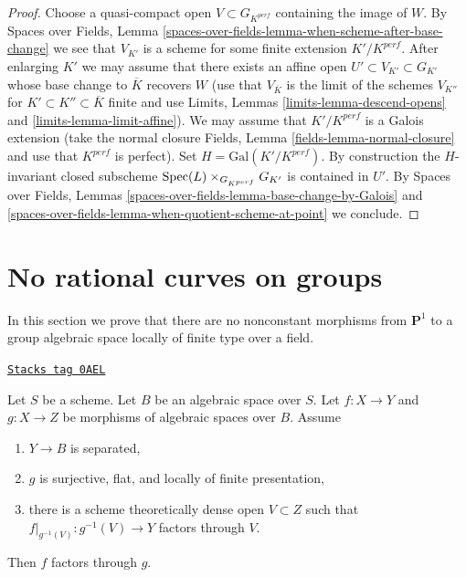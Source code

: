 \begin{proof}
\medskip\noindent
Choose a quasi-compact open $V \subset G_{K^{perf}}$ containing the
image of $W$. By Spaces over Fields,
Lemma \ref{spaces-over-fields-lemma-when-scheme-after-base-change}
we see that $V_{K'}$ is a scheme for some finite extension $K'/K^{perf}$.
After enlarging $K'$ we may assume that there exists an affine open
$U' \subset V_{K'} \subset G_{K'}$ whose base change to $\overline{K}$
recovers $W$ (use that $V_{\overline{K}}$ is the limit of the schemes
$V_{K''}$ for $K' \subset K'' \subset \overline{K}$ finite and use
Limits, Lemmas \ref{limits-lemma-descend-opens} and
\ref{limits-lemma-limit-affine}). We may assume
that $K'/K^{perf}$ is a Galois extension (take the normal closure
Fields, Lemma \ref{fields-lemma-normal-closure} and use
that $K^{perf}$ is perfect). Set $H = \text{Gal}(K'/K^{perf})$.
By construction the $H$-invariant closed subscheme
$\operatorname{Spec}(L) \times_{G_{K^{perf}}} G_{K'}$ is contained in $U'$.
By
Spaces over Fields, Lemmas
\ref{spaces-over-fields-lemma-base-change-by-Galois} and
\ref{spaces-over-fields-lemma-when-quotient-scheme-at-point} we conclude.
\end{proof}

\section{No rational curves on groups}
\label{spaces-more-groupoids-section-no-rational-curves}
In this section we prove that there are no nonconstant morphisms
from $\mathbf{P}^1$ to a group algebraic space locally of finite
type over a field.

\begin{lemma}
\label{spaces-more-groupoids-lemma-factor-through-over-open}
\href{https://stacks.math.columbia.edu/tag/0AEL}{\texttt{Stacks tag 0AEL}}

Let $S$ be a scheme. Let $B$ be an algebraic space over $S$.
Let $f : X \to Y$ and $g : X \to Z$ be morphisms of algebraic
spaces over $B$. Assume
\begin{enumerate}
\item $Y \to B$ is separated,
\item $g$ is surjective, flat, and locally of finite presentation,
\item there is a scheme theoretically dense open $V \subset Z$
such that $f|_{g^{-1}(V)} : g^{-1}(V) \to Y$ factors through $V$.
\end{enumerate}
Then $f$ factors through $g$.
\end{lemma}


